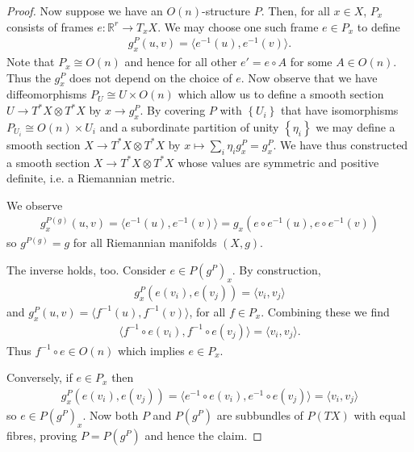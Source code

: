 \documentclass{article}
\begin{document}
\begin{theorem}
\begin{proof}
    Now suppose we have an $O(n)$-structure $P$. Then, for all $x\in X$,
    $P_x$ consists of frames $e:\mathbb{R}^r\to T_x X$. We may choose
    one such frame $e\in P_x$ to define
    \begin{align*}
      g^P_x(u,v) = \langle {e}^{-1}(u),{e}^{-1}(v)\rangle.
    \end{align*}
    Note that $P_x \cong O(n)$ and hence for all other $e'=e\circ A$ for
    some $A\in O(n)$. Thus the $g^P_x$ does not depend on the choice of
    $e$. Now observe that we have diffeomorphisms $P_U \cong U\times O(n)$
    which allow us to define a smooth section $U\to T^*X\otimes T^*X$ by
    $x\to g^P_x$. By covering $P$ with $\left\lbrace{U_i}\right\rbrace$
    that have isomorphisms $P_{U_i}\cong O(n)\times U_i$ and a subordinate
    partition of unity $\left\lbrace{\eta_i}\right\rbrace$ we may define
    a smooth section $X\to T^*X \otimes T^*X$ by $x\mapsto \sum_i \eta_i g^P_x = g^P_x$.
    We have thus constructed a smooth section $X\to T^*X\otimes T^*X$ whose
    values are symmetric and positive definite, i.e. a Riemannian metric.

    We observe
    \begin{align*}
      g^{P(g)}_x(u,v) = \langle {e}^{-1}(u),{e}^{-1}(v)\rangle
      = g_x(e\circ{e}^{-1}(u), e\circ{e}^{-1}(v))
    \end{align*}
    so $g^{P(g)}=g$ for all Riemannian manifolds $(X,g)$.

    The inverse holds, too. Consider $e\in P(g^P)_x$. By construction,
    \begin{align*}
      g^P_x(e(v_i),e(v_j))=\langle v_i, v_j\rangle
    \end{align*}
    and $g^P_x(u,v)=\langle{f}^{-1}(u),{f}^{-1}(v)\rangle$,
    for all $f\in P_x$. Combining these we find
    \begin{align*}
      \langle {f}^{-1}\circ e(v_i), {f}^{-1}\circ e(v_j)\rangle
      = \langle v_i, v_j\rangle.
    \end{align*}
    Thus ${f}^{-1}\circ e\in O(n)$ which implies $e\in P_x$.

    Conversely, if $e\in P_x$ then
    \begin{align*}
      g_x^P(e(v_i),e(v_j)) = \langle {e}^{-1}\circ e(v_i),{e}^{-1}\circ e(v_j)\rangle = \langle v_i,v_j\rangle
    \end{align*}
    so $e\in P(g^P)_x$. Now both $P$ and $P(g^P)$ are subbundles
    of $P(TX)$ with equal fibres, proving $P=P(g^P)$ and hence the claim.
  \end{proof}
\end{theorem}
\end{document}
